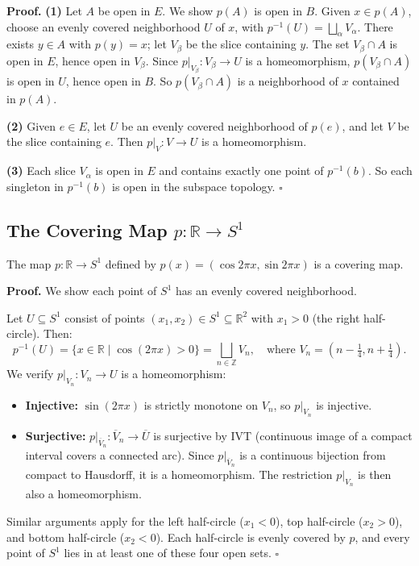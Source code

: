 \documentclass[11pt]{report}
\renewenvironment{proof}[1][Proof]{\noindent\textbf{#1.} }{\hfill$\square$\par\vspace{5pt}}
\begin{document}
\begin{proof}
\textbf{(1)} Let $A$ be open in $E$. We show $p(A)$ is open in $B$. Given $x \in p(A)$, choose an evenly covered neighborhood $U$ of $x$, with $p^{-1}(U) = \bigsqcup_\alpha V_\alpha$. There exists $y \in A$ with $p(y) = x$; let $V_\beta$ be the slice containing $y$. The set $V_\beta \cap A$ is open in $E$, hence open in $V_\beta$. Since $p|_{V_\beta}: V_\beta \to U$ is a homeomorphism, $p(V_\beta \cap A)$ is open in $U$, hence open in $B$. So $p(V_\beta \cap A)$ is a neighborhood of $x$ contained in $p(A)$.

\textbf{(2)} Given $e \in E$, let $U$ be an evenly covered neighborhood of $p(e)$, and let $V$ be the slice containing $e$. Then $p|_V: V \to U$ is a homeomorphism.

\textbf{(3)} Each slice $V_\alpha$ is open in $E$ and contains exactly one point of $p^{-1}(b)$. So each singleton in $p^{-1}(b)$ is open in the subspace topology.
\end{proof}

\subsection{The Covering Map $p: \mathbb{R} \to S^1$}

\begin{thmbox}
The map $p: \mathbb{R} \to S^1$ defined by $p(x) = (\cos 2\pi x, \sin 2\pi x)$ is a covering map.
\end{thmbox}

\begin{proof}
We show each point of $S^1$ has an evenly covered neighborhood.

Let $U \subseteq S^1$ consist of points $(x_1, x_2) \in S^1 \subseteq \mathbb{R}^2$ with $x_1 > 0$ (the right half-circle). Then:
\[p^{-1}(U) = \{x \in \mathbb{R} \mid \cos(2\pi x) > 0\} = \bigsqcup_{n \in \mathbb{Z}} V_n, \quad \text{where } V_n = \left(n - \tfrac{1}{4}, n + \tfrac{1}{4}\right).\]
We verify $p|_{V_n}: V_n \to U$ is a homeomorphism:
\begin{itemize}[nosep]
    \item \textbf{Injective:} $\sin(2\pi x)$ is strictly monotone on $V_n$, so $p|_{V_n}$ is injective.
    \item \textbf{Surjective:} $p|_{\overline{V}_n}: \overline{V}_n \to \overline{U}$ is surjective by IVT (continuous image of a compact interval covers a connected arc). Since $p|_{\overline{V}_n}$ is a continuous bijection from compact to Hausdorff, it is a homeomorphism. The restriction $p|_{V_n}$ is then also a homeomorphism.
\end{itemize}

Similar arguments apply for the left half-circle ($x_1 < 0$), top half-circle ($x_2 > 0$), and bottom half-circle ($x_2 < 0$). Each half-circle is evenly covered by $p$, and every point of $S^1$ lies in at least one of these four open sets.
\end{proof}
\end{document}
